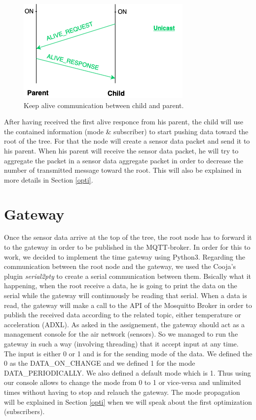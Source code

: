 \documentclass[a4paper,10pt]{article}
\begin{document}
\begin{figure}
\centering
\includegraphics[scale=0.6]{./img/alive.png}
\caption{Keep alive communication between child and parent.}
\label{fig:alive}
\end{figure}

After having received the first alive responce from his parent, the child will use the contained information (mode \& subscriber) to start pushing data toward the root of the tree. For that the node will create a sensor data packet and send it to his parent. When his parent will receive the sensor data packet, he will try to aggregate the packet in a sensor data aggregate packet in order to decrease the number of transmitted message toward the root. This will also be explained in more details in Section \ref{opti}.

\section{Gateway}
\label{gateway}

Once the sensor data arrive at the top of the tree, the root node has to forward it to the gateway in order to be published in the MQTT-broker. In order for this to work, we decided to implement the time gateway using Python3. Regarding the communication between the root node and the gateway, we used the Cooja's plugin \emph{serial2pty} to create a serial communication between them. Bsically what it happening, when the root receive a data, he is going to print the data on the serial while the gateway will continuously be reading that serial. When a data is read, the gateway will make a call to the API of the Mosquitto Broker in order to publish the received data according to the related topic, either temperature or acceleration (ADXL). As asked in the assignement, the gateway should act as a management console for the air network (sensors). So we managed to run the gateway in such a way (involving threading) that it accept input at any time. The input is either 0 or 1 and is for the sending mode of the data. We defined the 0 as the DATA\_ON\_CHANGE and we defined 1 for the mode DATA\_PERIODICALLY. We also defined a default mode which is 1. Thus using our console allows to change the mode from 0 to 1 or vice-versa and unlimited times without having to stop and relauch the gateway. The mode propagation will be explained in Section \ref{opti} when we will speak about the first optimization (subscribers).
\end{document}
